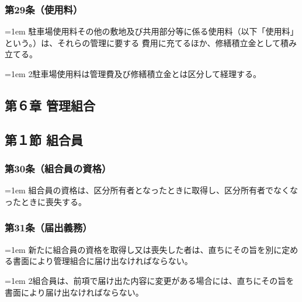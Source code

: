 \documentclass[
  luatex,
  paper=a4paper,
  fontsize=11pt,
  jafontsize=11pt,
  jlreq_notes,
]{jlreq}
\newcommand{\joumain}[1]{%
  \noindent\hangindent=1em\hangafter=1
  \hspace{1em}#1%
}
\newcommand{\kou}[2]{%
  \par\noindent\hangindent=1em\hangafter=1
  #1\hspace{1em}#2%
}
\begin{document}
  \subsubsection*{第29条（使用料）}
  \joumain{駐車場使用料その他の敷地及び共用部分等に係る使用料（以下「使用料」という。）は、それらの管理に要する
  費用に充てるほか、修繕積立金として積み立てる。}
  \kou{2}{駐車場使用料は管理費及び修繕積立金とは区分して経理する。}
  
  \begin{center}
  \subsection*{第６章 管理組合}
  \subsection*{第１節 組合員}
  \end{center}

  \subsubsection*{第30条（組合員の資格）}
  \joumain{組合員の資格は、区分所有者となったときに取得し、区分所有者でなくなったときに喪失する。}

  \subsubsection*{第31条（届出義務）}
  \joumain{新たに組合員の資格を取得し又は喪失した者は、直ちにその旨を別に定める書面により管理組合に届け出なければならない。}
  \kou{2}{組合員は、前項で届け出た内容に変更がある場合には、直ちにその旨を書面により届け出なければならない。}
\end{document}
